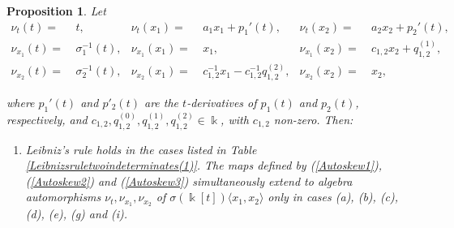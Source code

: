 \documentclass{amsart}
\newtheorem{proposition}[theorem]{Proposition}
\theoremstyle{definition}
\theoremstyle{remark}
\numberwithin{equation}{section}
\begin{document}
\begin{proposition}\label{autoSkewPBW} 
Let
\begin{align}
   \nu_t(t) = &\ t, & \nu_t(x_1) = &\ a_1x_1 + p_1'(t), & \nu_t(x_2) = &\ a_2x_2+p_2'(t), \label{Autoskew1} \\ 
    \nu_{x_1}(t) = &\ \sigma_{1}^{-1}(t), & \nu_{x_1}(x_1) = &\ x_1, &  \nu_{x_1}(x_2) = &\ c_{1,2}x_2+q_{1,2}^{(1)}, \label{Autoskew2} \\
    \nu_{x_2}(t) = &\ \sigma_{2}^{-1}(t), & \nu_{x_2}(x_1) = &\ c_{1,2}^{-1}x_1-c_{1,2}^{-1}q_{1,2}^{(2)}, & \nu_{x_2}(x_2) = &\ x_2, \label{Autoskew3}
\end{align}

where $p_1'(t)$ and $p'_2(t)$ are the $t$-derivatives of $p_1(t)$ and $p_2(t)$, respectively, and $c_{1,2}, q_{1,2}^{(0)}, q_{1,2}^{(1)}, q_{1,2}^{(2)} \in \Bbbk$, with $c_{1,2}$ non-zero. Then:
\begin{enumerate}
\item [\rm (1)] Leibniz's rule holds in the cases listed in Table \ref{Leibnizsruletwoindeterminates(1)}. The maps defined by {\rm (}\ref{Autoskew1}{\rm )}, {\rm (}\ref{Autoskew2}{\rm )} and {\rm (}\ref{Autoskew3}{\rm )} simultaneously extend to algebra automorphisms $\nu_t, \nu _{x_1}, \nu_{x_2}$ of $\sigma(\Bbbk[t])\langle x_1, x_2\rangle$ only in cases {\rm (a)}, {\rm (b)}, {\rm (c)}, {\rm (d)}, {\rm (e)}, {\rm (g)} and {\rm (i)}.
\end{enumerate}


\end{proposition}
\end{document}
